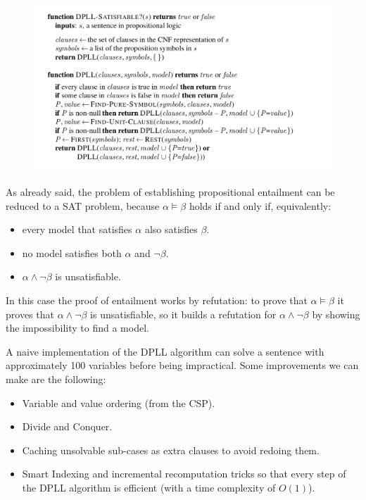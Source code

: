 \documentclass{article}
\begin{document}
\begin{figure}[h]
    \centering
    \includegraphics[width=1\linewidth]{algorithms/DPLL.png}
    \label{fig:dpll_algorithm}
\end{figure}

As already said, the problem of establishing propositional entailment can be reduced to a SAT problem, because $\alpha \models \beta$ holds if and only if, equivalently:
\begin{itemize}
    \item every model that satisfies $\alpha$ also satisfies $\beta$.
    \item no model satisfies both $\alpha$ and $\neg \beta$.
    \item $\alpha \land \neg \beta$ is unsatisfiable.
\end{itemize}

\noindent 
In this case the proof of entailment works by refutation: to prove that $\alpha \models \beta$ it proves that $\alpha \land \neg \beta$ is unsatisfiable, so it builds a refutation for $\alpha \land \neg \beta$ by showing the impossibility to find a model.  

A naive implementation of the DPLL algorithm can solve a sentence with approximately 100 variables before being impractical. Some improvements we can make are the following:
\begin{itemize}
    \item Variable and value ordering (from the CSP).
    \item Divide and Conquer.
    \item Caching unsolvable sub-cases as extra clauses to avoid redoing them.
    \item Smart Indexing and incremental recomputation tricks so that every step of the DPLL algorithm is efficient (with a time complexity of $O(1)$).
\end{itemize}
\end{document}
